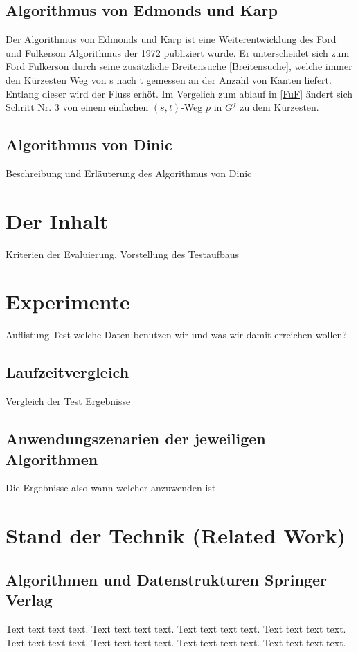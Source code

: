 \documentclass[a4paper]{llncs}
\begin{document}
\subsection{Algorithmus von Edmonds und Karp}
Der Algorithmus von Edmonds und Karp ist eine Weiterentwicklung des Ford und Fulkerson Algorithmus der 1972 publiziert wurde.
Er unterscheidet sich zum Ford Fulkerson durch seine zusätzliche Breitensuche \ref{Breitensuche},
welche immer den Kürzesten Weg von s nach t gemessen an der Anzahl von Kanten liefert. 
Entlang dieser wird der Fluss erhöt.
Im Vergelich zum ablauf in \ref{FuF} ändert sich Schritt Nr. 3 von einem einfachen $(s, t)$-Weg $p$ in $G^{f}$ zu dem Kürzesten.

\subsection{Algorithmus von Dinic}
Beschreibung und Erläuterung des Algorithmus von Dinic


\section{Der Inhalt}
\label{Inhalt}
Kriterien der Evaluierung, Vorstellung des Testaufbaus
\section{Experimente}
\label{Experimente}
Auflistung Test welche Daten benutzen wir und was wir damit erreichen wollen?
\subsection{Laufzeitvergleich}
Vergleich der Test Ergebnisse

\subsection{Anwendungszenarien der jeweiligen Algorithmen}
Die Ergebnisse also wann welcher anzuwenden ist

\section{Stand der Technik (Related Work)}
\label{Related Work}
\subsection{Algorithmen und Datenstrukturen Springer Verlag}
Text text text text. Text text text text. Text text text text. Text text text text. Text text text text. Text text text text. Text text text text. Text text text text. 
\end{document}
